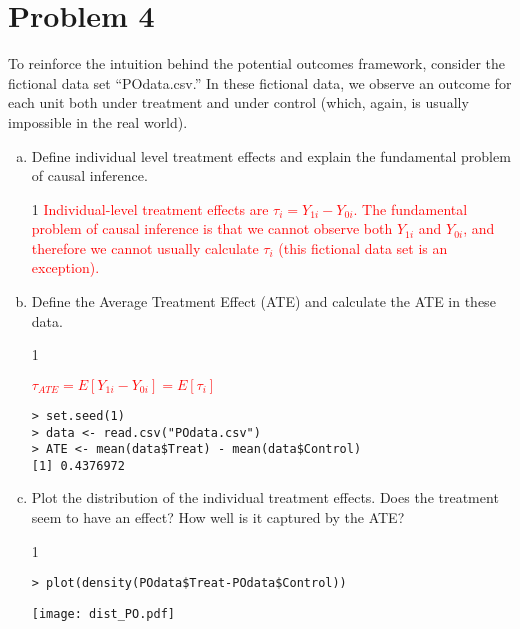 \documentclass[12pt,letterpaper]{article}
\newcommand{\solutions}{0}
\begin{document}
\section*{Problem 4}
To reinforce the intuition behind the potential outcomes framework, consider the fictional data set ``POdata.csv.'' In these fictional data, we observe an outcome for each unit both under treatment and under control (which, again, is usually impossible in the real world). 
\begin{enumerate}[(a)]
\item Define individual level treatment effects and explain the fundamental problem of causal inference.

\if\solutions1
\textcolor{red}{Individual-level treatment effects are $\tau_i=Y_{1i}-Y_{0i}$. The fundamental problem of causal inference is that we cannot observe both $Y_{1i}$ and $Y_{0i}$, and therefore we cannot usually calculate  $\tau_i$ (this fictional data set is an exception).}
\fi

\item Define the Average Treatment Effect (ATE) and calculate the ATE in these data.

\if\solutions1
{\color{red}
\textcolor{red}{$\tau_{ATE}=E[Y_{1i}-Y_{0i}]=E[\tau_i]$} 
\begin{verbatim}
> set.seed(1)
> data <- read.csv("POdata.csv")
> ATE <- mean(data$Treat) - mean(data$Control)
[1] 0.4376972
\end{verbatim}
}
\fi

\item Plot the distribution of the individual treatment effects. Does the treatment seem to have an effect? How well is it captured by the ATE?

\if\solutions1
{\color{red}
\begin{verbatim}
> plot(density(POdata$Treat-POdata$Control))
\end{verbatim}
}
\begin{center}
\vspace*{0cm}\hspace*{0cm}\texttt{[image: dist\_PO.pdf]}
\end{center}
\fi

\end{enumerate}
\end{document}
